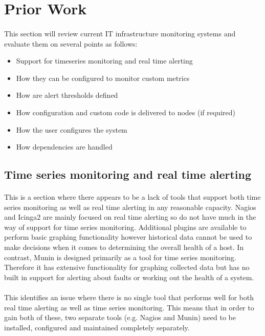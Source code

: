 \documentclass[bsc,logo,twoside,singlespacing]{infthesis}
\begin{document}
\section{Prior Work}
\paragraph*{}
This section will review current IT infrastructure monitoring systems and
evaluate them on several points as follows:
\begin{itemize}
	\item Support for timeseries monitoring and real time alerting
	\item How they can be configured to monitor custom metrics
	\item How are alert thresholds defined
	\item How configuration and custom code is delivered to nodes (if required)
	\item How the user configures the system
	\item How dependencies are handled
\end{itemize}

\subsection{Time series monitoring and real time alerting}
\paragraph*{}
	This is a section where there appears to be a lack of tools that support both
	time series monitoring as well as real time alerting in any reasonable capacity.
	Nagios and Icinga2 are mainly focused on real time alerting so do not have much
	in the way of support for time series monitoring.  Additional plugins are
	available to perform basic graphing functionality however historical data
	cannot be used to make decisions when it comes to determining the overall
	health of a host. In contrast, Munin is designed primarily as a tool for time
	series monitoring.  Therefore it has extensive functionality for graphing
	collected data but has no built in support for alerting about faults or working
	out the health of a system.
	
\paragraph*{}
	This identifies an issue where there is no single tool that performs well for
	both real time alerting as well as time series monitoring.  This means that
	in order to gain both of these, two separate tools (e.g. Nagios and Munin)
	need to be installed, configured and maintained completely separately.
\end{document}
